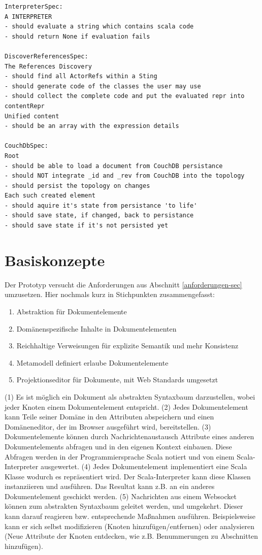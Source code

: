 \begin{verbatim}
InterpreterSpec:
A INTERPRETER
- should evaluate a string which contains scala code
- should return None if evaluation fails

DiscoverReferencesSpec:
The References Discovery
- should find all ActorRefs within a Sting
- should generate code of the classes the user may use
- should collect the complete code and put the evaluated repr into contentRepr
Unified content
- should be an array with the expression details

CouchDbSpec:
Root
- should be able to load a document from CouchDB persistance
- should NOT integrate _id and _rev from CouchDB into the topology
- should persist the topology on changes
Each such created element
- should aquire it's state from persistance 'to life'
- should save state, if changed, back to persistance
- should save state if it's not persisted yet
\end{verbatim}
 
\section{Basiskonzepte}\label{basiskonzepte}
 
Der Prototyp versucht die Anforderungen aus Abschnitt \ref{anforderungen-sec} umzusetzen. Hier nochmals kurz in Stichpunkten zusammengefasst:

 
\begin{enumerate}

\item Abstraktion für Dokumentelemente
\item Domänenspezifische Inhalte in Dokumentelementen
\item Reichhaltige Verweisungen für explizite Semantik und mehr Konsistenz
\item Metamodell definiert erlaube Dokumentelemente
\item Projektionseditor für Dokumente, mit Web Standards umgesetzt
\end{enumerate}
 
(1) Es ist möglich ein Dokument als abstrakten Syntaxbaum darzustellen, wobei jeder Knoten einem Dokumentelement entspricht. (2) Jedes Dokumentelement kann Teile seiner Domäne in den Attributen abspeichern und einen Domäneneditor, der im Browser ausgeführt wird, bereitstellen. (3) Dokumentelemente können durch Nachrichtenaustausch Attribute eines anderen Dokumentelements abfragen und in den eigenen Kontext einbauen. Diese Abfragen werden in der Programmiersprache Scala notiert und von einem Scala-Interpreter ausgewertet. (4) Jedes Dokumentelement implementiert eine Scala Klasse wodurch es repräsentiert wird. Der Scala-Interpreter kann diese Klassen instanziieren und ausführen. Das Resultat kann z.B. an ein anderes Dokumentelement geschickt werden. (5) Nachrichten aus einem Websocket können zum abstrakten Syntaxbaum geleitet werden, und umgekehrt. Dieser kann darauf reagieren bzw. entsprechende Maßnahmen ausführen. Beispielsweise kann er sich selbst modifizieren (Knoten hinzufügen/entfernen) oder analysieren (Neue Attribute der Knoten entdecken, wie z.B. Benummerungen zu Abschnitten hinzufügen).

